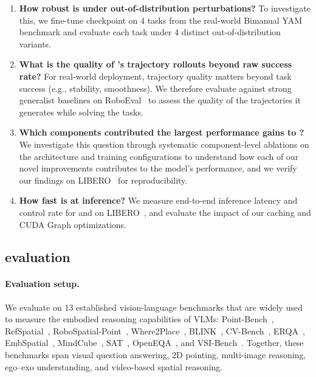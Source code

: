 \begin{enumerate}
   \item \textbf{How robust is \molmoactt under out-of-distribution perturbations?} To investigate this, we fine-tune \molmoacttpos checkpoint on 4 tasks from the real-world Bimanual YAM benchmark and evaluate each task under 4 distinct out-of-distribution variants.

    \item \textbf{What is the quality of \molmoactt's trajectory rollouts beyond raw success rate?}
    For real-world deployment, trajectory quality matters beyond task success (e.g., stability, smoothness). We therefore evaluate \molmoactt against strong generalist baselines on RoboEval~\citep{wang2025roboeval} to assess the quality of the trajectories it generates while solving the tasks.

    \item \textbf{Which components contributed the largest performance gains to \molmoactt?}
    We investigate this question through systematic component-level ablations on the \molmoactt architecture and training configurations to understand how each of our novel improvements contributes to the model's performance, and we verify our findings on LIBERO~\citep{liu2023libero} for reproducibility.

    \item \textbf{How fast is \molmoactt at inference?}
    We measure end-to-end inference latency and control rate for \molmoactt and \molmothink on LIBERO~\citep{liu2023libero}, and evaluate the impact of our caching and CUDA Graph optimizations.

 

  
\end{enumerate}





\subsection{\molmoer evaluation}
\label{sec:exp-er}

\paragraph{Evaluation setup.} We evaluate \molmoer on 13 established vision-language benchmarks that are widely used to measure the embodied reasoning capabilities of VLMs: Point-Bench~\citep{cheng2025pointarena}, RefSpatial~\citep{zhou2025roborefer}, RoboSpatial-Point~\citep{song2025robospatial}, Where2Place~\citep{yuan2024robopoint}, BLINK~\citep{fu2024blink}, CV-Bench~\citep{tong2024cambrian}, ERQA~\citep{team2025gemini}, EmbSpatial~\citep{du2024embspatial}, MindCube~\citep{luopyspatial}, SAT~\citep{ray2025satdynamicspatialaptitude}, OpenEQA~\citep{majumdar2024openeqa}, and VSI-Bench~\citep{yang2025thinking}. Together, these benchmarks span visual question answering, 2D pointing, multi-image reasoning, ego–exo understanding, and video-based spatial reasoning. 


